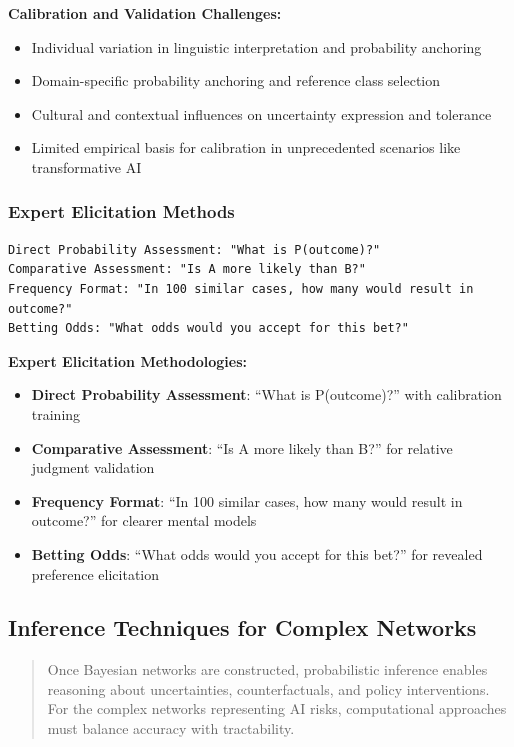 \documentclass[
  11pt,
  letterpaper,
]{book}
\providecommand{\tightlist}{%
  \setlength{\itemsep}{0pt}\setlength{\parskip}{0pt}}
\begin{document}
\textbf{Calibration and Validation Challenges:}

\begin{itemize}
\tightlist
\item
  Individual variation in linguistic interpretation and probability
  anchoring
\item
  Domain-specific probability anchoring and reference class selection
\item
  Cultural and contextual influences on uncertainty expression and
  tolerance
\item
  Limited empirical basis for calibration in unprecedented scenarios
  like transformative AI
\end{itemize}

\subsubsection{Expert Elicitation Methods}\label{sec-expert-elicitation}

\begin{verbatim}
Direct Probability Assessment: "What is P(outcome)?"
Comparative Assessment: "Is A more likely than B?"  
Frequency Format: "In 100 similar cases, how many would result in outcome?"
Betting Odds: "What odds would you accept for this bet?"
\end{verbatim}

\textbf{Expert Elicitation Methodologies:}

\begin{itemize}
\tightlist
\item
  \textbf{Direct Probability Assessment}: ``What is P(outcome)?'' with
  calibration training
\item
  \textbf{Comparative Assessment}: ``Is A more likely than B?'' for
  relative judgment validation
\item
  \textbf{Frequency Format}: ``In 100 similar cases, how many would
  result in outcome?'' for clearer mental models
\item
  \textbf{Betting Odds}: ``What odds would you accept for this bet?''
  for revealed preference elicitation
\end{itemize}

\subsection{Inference Techniques for Complex
Networks}\label{sec-inference-techniques}

\begin{quote}
Once Bayesian networks are constructed, probabilistic inference enables
reasoning about uncertainties, counterfactuals, and policy
interventions. For the complex networks representing AI risks,
computational approaches must balance accuracy with tractability.
\end{quote}
\end{document}
